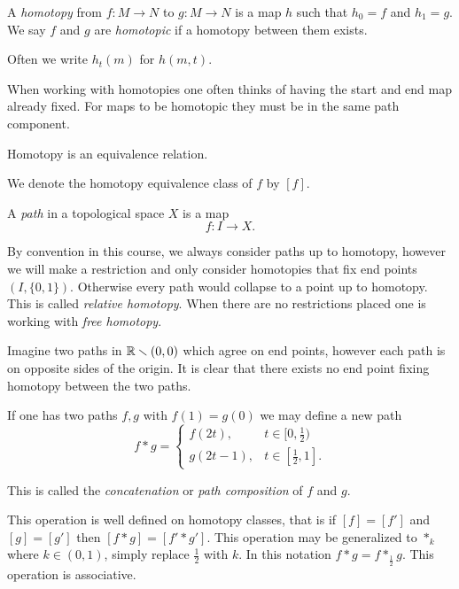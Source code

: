 \documentclass[11pt,leqno,oneside]{amsart}
\numberwithin{thm}{section}
\renewcommand{\setminus}{\smallsetminus}
\begin{document}
\begin{defn}
  A \emph{homotopy} from \(f \colon M \to N\) to \(g \colon M \to N\)
  is a map \(h\) such that \(h_0=f\) and \(h_1=g\). We say \(f\) and
  \(g\) are \emph{homotopic} if a homotopy between them exists.

  Often we write \(h_t(m)\) for \(h(m,t)\).
\end{defn}

When working with homotopies one often thinks of having the start and
end map already fixed. For maps to be homotopic they must be in the
same path component.

\begin{prop}
  Homotopy is an equivalence relation.
\end{prop}

We denote the homotopy equivalence class of \(f\) by \([f]\).

\begin{defn}
  A \emph{path} in a topological space $X$ is a map
  \[f \colon I \to X.\]
\end{defn}

By convention in this course, we always consider paths up to homotopy,
however we will make a restriction and only consider homotopies that
fix end points \((I,\{0,1\})\). Otherwise every path would collapse to
a point up to homotopy. This is called \emph{relative homotopy}. When
there are no restrictions placed one is working with \emph{free
  homotopy}.

Imagine two paths in \(\R \setminus (0,0)\) which agree on end points,
however each path is on opposite sides of the origin. It is clear that
there exists no end point fixing homotopy between the two paths.

\begin{defn}
  If one has two paths \(f,g\) with \(f(1)=g(0)\) we may define a new
  path
  \[f * g =
    \begin{cases}
      f(2t), & t \in [0,\frac{1}{2})\\
      g(2t - 1), & t \in [\frac{1}{2},1].
    \end{cases}
  \]

  This is called the \emph{concatenation} or \emph{path composition}
  of $f$ and $g$.

  This operation is well defined on homotopy classes, that is if
  \([f]=[f']\) and \([g]=[g']\) then \([f * g] = [f' * g']\). This
  operation may be generalized to \(*_{k}\) where \(k \in (0,1)\),
  simply replace \(\frac{1}{2}\) with \(k\). In this notation
  \(f * g = f *_{\frac{1}{2}} g\). This operation is associative.
\end{defn}
\end{document}
